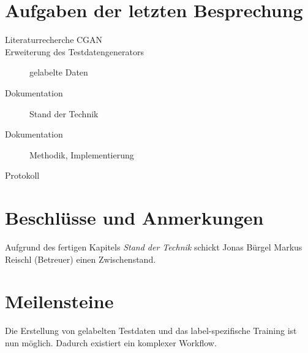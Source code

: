 
\newcommand{\Titel}{6. Protokoll}
\newcommand{\Teilnehmer}{Jonas Bürgel, Patrick Welter}
\newcommand{\DatumUndZeit}{21.02.2022 20:00-20:15}
\newcommand{\Ort}{Discord Meeting}
\newcommand{\Thema}{Erweiterung GAN: Einführung gelabelte Daten}


\section{Aufgaben der letzten Besprechung}
\begin{description}
	\item[Literaturrecherche CGAN]  \halfcheck
	\item[Erweiterung des Testdatengenerators] gelabelte Daten  \fullcheck
	\item[Dokumentation] Stand der Technik  \fullcheck
	\item[Dokumentation] Methodik, Implementierung  \halfcheck
	\item[Protokoll]  \fullcheck
\end{description}


\section{Beschlüsse und Anmerkungen}
\begin{description}[style=nextline]
	\item[Zwischenstand]
	Aufgrund des fertigen Kapitels \textit{Stand der Technik} schickt Jonas Bürgel Markus Reischl (Betreuer) einen Zwischenstand.
\end{description}

\section{Meilensteine}
\begin{description}[style=nextline]
	\item[Komplexer Trainingsworkflow mit gelabelten Daten \hfill \fullcheck]
	Die Erstellung von gelabelten Testdaten und das label-spezifische Training ist nun möglich.
	Dadurch existiert ein komplexer Workflow.
\end{description}

